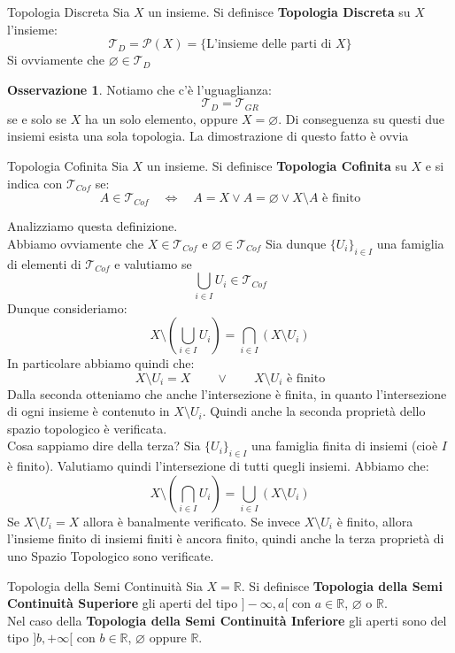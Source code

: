 \documentclass[11pt,a4paper,twoside]{article}
\theoremstyle{definition}
\newtheorem*{oss}{Osservazione}
\begin{document}
\begin{defn}{Topologia Discreta}{}
	Sia $X$ un insieme. Si definisce \textbf{Topologia Discreta} su $X$ l'insieme:
	\[ \mathcal T_D = \mathcal P(X) = \{\text{L'insieme delle parti di }X\}\]
	Si ovviamente che $\varnothing \in \mathcal T_D$
\end{defn}

\begin{oss}
	Notiamo che c'è l'uguaglianza:
	\[ \mathcal T_D = \mathcal T_{GR} \]
	se e solo se $X$ ha un solo elemento, oppure $X = \varnothing$. Di conseguenza su questi due insiemi esista una sola topologia. La dimostrazione di questo fatto è ovvia
\end{oss}

\begin{defn}{Topologia Cofinita}{}
	Sia $X$ un insieme. Si definisce \textbf{Topologia Cofinita} su $X$ e si indica con $\mathcal T_{Cof}$ se:
	\[ A \in \mathcal T_{Cof} \quad \Leftrightarrow \quad A = X \vee A = \varnothing \vee X\setminus A \text{ è finito} \]
\end{defn}

Analizziamo questa definizione.\\
Abbiamo ovviamente che $X \in \mathcal T_{Cof}$ e $\varnothing \in \mathcal T_{Cof}$
Sia dunque $\{U_i\}_{i \in I}$ una famiglia di elementi di $\mathcal T_{Cof}$ e valutiamo se
\[
	\bigcup_{i \in I}U_i \in \mathcal T_{Cof}
\]
Dunque consideriamo:
\[
	X \setminus \left( \bigcup_{i \in I} U_i\right) = \bigcap_{i \in I}\left(X \setminus U_i\right)
\]
In particolare abbiamo quindi che:
\[ X\setminus U_i = X \qquad \vee \qquad X\setminus U_i \text{ è finito} \]
Dalla seconda otteniamo che anche l'intersezione è finita, in quanto l'intersezione di ogni insieme è contenuto in $X\setminus U_i$. Quindi anche la seconda proprietà dello spazio topologico è verificata.\\
Cosa sappiamo dire della terza? Sia $\{U_i\}_{i \in I}$ una famiglia finita di insiemi (cioè $I$ è finito). Valutiamo quindi l'intersezione di tutti quegli insiemi. Abbiamo che:
\[ X \setminus \left(\bigcap_{i \in I}U_i\right) = \bigcup_{i \in I}(X\setminus U_i) \]
Se $X \setminus U_i =X$ allora è banalmente verificato. Se invece $X\setminus U_i$ è finito, allora l'insieme finito di insiemi finiti è ancora finito, quindi anche la terza proprietà di uno Spazio Topologico sono verificate.

\begin{defn}{Topologia della Semi Continuità}{}
	Sia $X = \mathbb R$. Si definisce \textbf{Topologia della Semi Continuità Superiore} gli aperti del tipo $]-\infty, a[$ con $a \in \mathbb R$, $\varnothing$ o $\mathbb R$.\\
	Nel caso della \textbf{Topologia della Semi Continuità Inferiore} gli aperti sono del tipo $]b, +\infty[$ con $b \in \mathbb R$, $\varnothing$ oppure $\mathbb R$.
\end{defn}
\end{document}
